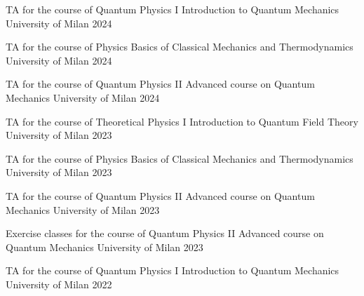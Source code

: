 
\begin{cvhonors}

    \cvhonor
    {TA for the course of Quantum Physics I} %
    {Introduction to Quantum Mechanics}
    {University of Milan} %
    {2024}

    \cvhonor
    {TA for the course of Physics} %
    {Basics of Classical Mechanics and Thermodynamics}
    {University of Milan} %
    {2024}

    \cvhonor
    {TA for the course of Quantum Physics II} %
    {Advanced course on Quantum Mechanics}
    {University of Milan} %
    {2024}

    \cvhonor
    {TA for the course of Theoretical Physics I} %
    {Introduction to Quantum Field Theory}
    {University of Milan} %
    {2023}

    \cvhonor
    {TA for the course of Physics} %
    {Basics of Classical Mechanics and Thermodynamics}
    {University of Milan} %
    {2023}

    \cvhonor
    {TA for the course of Quantum Physics II} %
    {Advanced course on Quantum Mechanics}
    {University of Milan} %
    {2023}

    \cvhonor
    {Exercise classes for the course of Quantum Physics II} %
    {Advanced course on Quantum Mechanics}
    {University of Milan} %
    {2023}

    \cvhonor
    {TA for the course of Quantum Physics I} %
    {Introduction to Quantum Mechanics}
    {University of Milan} %
    {2022}

    
    


\end{cvhonors}